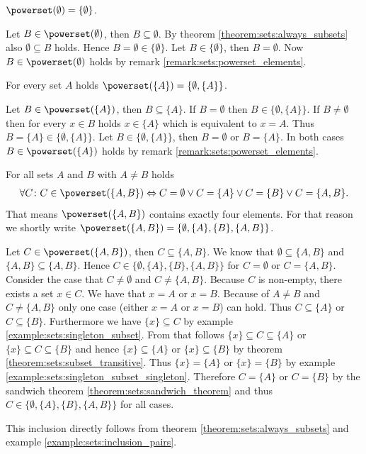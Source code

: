 \begin{examples}
    \begin{exampleenumerate}
        \item $\powerset(\emptyset)=\{\emptyset\}$.
        \begin{miniproof}
            \proofsubset Let $B\in\powerset(\emptyset)$, then $B\subseteq\emptyset$. By theorem \ref{theorem:sets:always_subsets} also $\emptyset\subseteq B$ holds. Hence $B=\emptyset\in\{\emptyset\}$.
            \proofsupset Let $B\in\{\emptyset\}$, then $B=\emptyset$. Now $B\in\powerset(\emptyset)$ holds by remark \ref{remark:sets:powerset_elements}.
        \end{miniproof}
        \item For every set $A$ holds $\powerset(\{A\})=\{\emptyset,\{A\}\}$.
        \begin{miniproof}
            \proofsubset Let $B\in\powerset(\{A\})$, then $B\subseteq\{A\}$. If $B=\emptyset$ then $B\in\{\emptyset,\{A\}\}$. If $B\neq\emptyset$ then for every $x\in B$ holds $x\in\{A\}$ which is equivalent to $x=A$. Thus $B=\{A\}\in\{\emptyset,\{A\}\}$.
            \proofsupset Let $B\in\{\emptyset,\{A\}\}$, then $B=\emptyset$ or $B=\{A\}$. In both cases $B\in\powerset(\{A\})$ holds by remark \ref{remark:sets:powerset_elements}.
        \end{miniproof}
        \item For all sets $A$ and $B$ with $A\neq B$ holds \begin{align}\forall C\colon C\in\powerset(\{A,B\})\Leftrightarrow C=\emptyset\lor C=\{A\}\lor C=\{B\}\lor C=\{A,B\}.\end{align}
        That means $\powerset(\{A,B\})$ contains exactly four elements. For that reason we shortly write $\powerset(\{A,B\})=\{\emptyset,\{A\},\{B\},\{A,B\}\}$.
        \begin{miniproof}
            \proofsubset Let $C\in\powerset(\{A,B\})$, then $C\subseteq\{A,B\}$. We know that $\emptyset\subseteq\{A,B\}$ and $\{A,B\}\subseteq\{A,B\}$. Hence $C\in\{\emptyset,\{A\},\{B\},\{A,B\}\}$ for $C=\emptyset$ or $C=\{A,B\}$. Consider the case that $C\neq\emptyset$ and $C\neq\{A,B\}$. Because $C$ is non-empty, there exists a set $x\in C$. We have that $x=A$ or $x=B$. Because of $A\neq B$ and $C\neq\{A,B\}$ only one case (either $x=A$ or $x=B$) can hold. Thus $C\subseteq\{A\}$ or $C\subseteq\{B\}$. Furthermore we have $\{x\}\subseteq C$ by example \ref{example:sets:singleton_subset}. From that follows $\{x\}\subseteq C\subseteq\{A\}$ or $\{x\}\subseteq C\subseteq\{B\}$ and hence $\{x\}\subseteq\{A\}$ or $\{x\}\subseteq\{B\}$ by theorem \ref{theorem:sets:subset_transitive}. Thus $\{x\}=\{A\}$ or $\{x\}=\{B\}$ by example \ref{example:sets:singleton_subset_singleton}. Therefore $C=\{A\}$ or $C=\{B\}$ by the sandwich theorem \ref{theorem:sets:sandwich_theorem} and thus $C\in\{\emptyset,\{A\},\{B\},\{A,B\}\}$ for all cases.

            \proofsupset This inclusion directly follows from theorem \ref{theorem:sets:always_subsets} and example \ref{example:sets:inclusion_pairs}.
        \end{miniproof}
    \end{exampleenumerate}
\end{examples}

